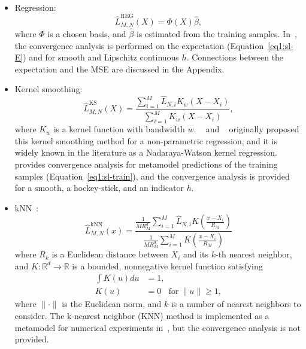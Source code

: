 \begin{itemize}
    \item   Regression:
            $$\hat{L}^{\text{REG}}_{M, N}(X) = \Phi(X) \hat{\beta},$$
            where $\Phi$ is a chosen basis, and $\hat{\beta}$ is estimated from the training samples.
            In~\cite{broadie2015risk}, the convergence analysis is performed on the expectation (Equation~\ref{eq1:sl-E}) and for smooth and Lipschitz continuous $h$. 
            Connections between the expectation and the MSE are discussed in the Appendix.
    \item   Kernel smoothing:
            $$\hat{L}^{\text{KS}}_{M, N}(X) = \frac{\sum_{i=1}^M \hat{L}_{N, i} K_w(X - X_i)}{\sum_{i=1}^M K_w(X - X_i)}, $$
            where $K_w$ is a kernel function with bandwidth $w$.
            ~\cite{nadaraya1964estimating} and ~\cite{watson1964smooth} originally proposed this kernel smoothing method for a non-parametric regression, and it is widely known in the literature as a Nadaraya-Watson kernel regression.
            ~\cite{hong2017kernel} provides convergence analysis for metamodel predictions of the training samples (Equation~\ref{eq1:sl-train}), and the convergence analysis is provided for a smooth, a hockey-stick, and an indicator $h$. 

    \item   kNN~\citep{mack1981local}:
            \begin{equation*}
            \hat{L}^{\text{kNN}}_{M, N}(x) 
            = \frac{\frac{1}{M R_M^d} \sum_{i=1}^M \hat{L}_{N, i} K\left(\frac{x - X_i}{R_M}\right)}{\frac{1}{M R_M^d} \sum_{i=1}^M K\left(\frac{x - X_i}{R_M}\right)}
            \end{equation*}
            where $R_k$ is a Euclidean distance between $X_i$ and its $k$-th nearest neighbor, and $K:\mathbb{R}^d \rightarrow \mathbb{R}$ is a bounded, nonnegative kernel function satisfying 
            \begin{align*}
                \int K(u) du & = 1, \\
                K(u) &= 0 ~~~ ~\text{for}~ \|u\| \geq 1,
            \end{align*}
            where $\|\cdot\|$ is the Euclidean norm, and  $k$ is a number of nearest neighbors to consider.
            The k-nearest neighbor (KNN) method is implemented as a metamodel for numerical experiments in~\cite{hong2017kernel}, but the convergence analysis is not provided.


\end{itemize}
